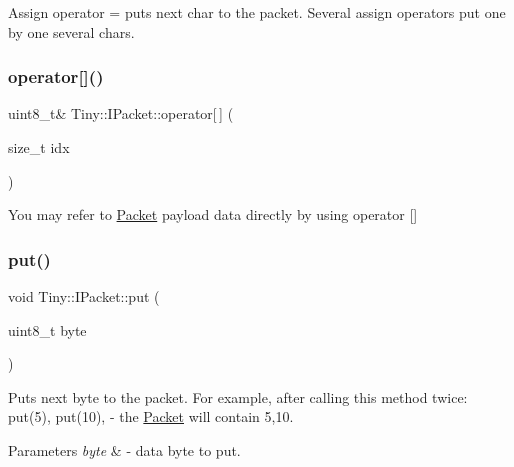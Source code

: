 Assign operator = puts next char to the packet. Several assign operators put one by one several chars. \mbox{\label{classTiny_1_1IPacket_aa1d796806e21d1c72a1fc12d2f6db592}} 
\subsubsection{\texorpdfstring{operator[]()}{operator[]()}}
{\footnotesize\ttfamily uint8\+\_\+t\& Tiny\+::\+I\+Packet\+::operator\mbox{[}$\,$\mbox{]} (\begin{DoxyParamCaption}\item[{size\+\_\+t}]{idx }\end{DoxyParamCaption})\hspace{0.3cm}{\ttfamily [inline]}}

You may refer to \hyperlink{classTiny_1_1Packet}{Packet} payload data directly by using operator \mbox{[}\mbox{]} \mbox{\label{classTiny_1_1IPacket_a9d5ba62a453b9cd364c0e214c245f11d}} 
\subsubsection{\texorpdfstring{put()}{put()}\hspace{0.1cm}{\footnotesize\ttfamily [1/7]}}
{\footnotesize\ttfamily void Tiny\+::\+I\+Packet\+::put (\begin{DoxyParamCaption}\item[{uint8\+\_\+t}]{byte }\end{DoxyParamCaption})\hspace{0.3cm}{\ttfamily [inline]}}

Puts next byte to the packet. For example, after calling this method twice\+: put(5), put(10), -\/ the \hyperlink{classTiny_1_1Packet}{Packet} will contain 5,10. 
\begin{DoxyParams}{Parameters}
{\em byte} & -\/ data byte to put. \\
\hline
\end{DoxyParams}
\mbox{\label{classTiny_1_1IPacket_a9dd0344bbed4500af63a3f700d31945b}} 
